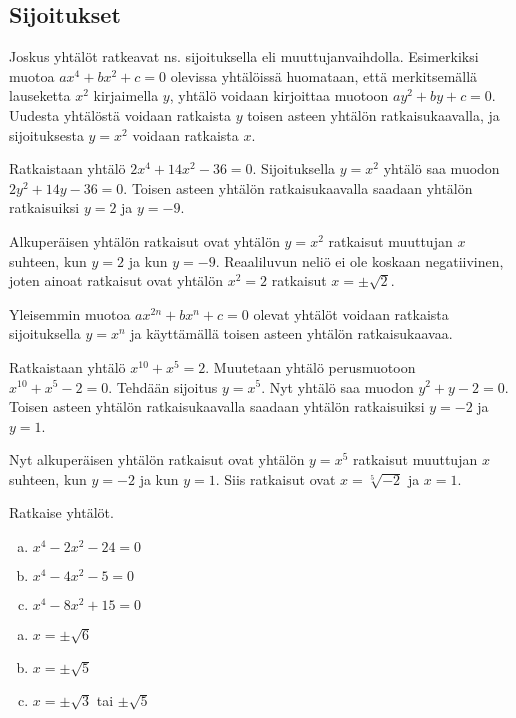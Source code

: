 \subsection*{Sijoitukset}
Joskus yhtälöt ratkeavat ns. sijoituksella eli muuttujanvaihdolla. Esimerkiksi muotoa $ax^4+bx^2+c=0$ olevissa yhtälöissä huomataan, että merkitsemällä
lauseketta $x^2$ kirjaimella $y$, yhtälö voidaan kirjoittaa muotoon $ay^2+by+c=0$. Uudesta yhtälöstä voidaan ratkaista $y$ toisen asteen yhtälön
ratkaisukaavalla, ja sijoituksesta $y = x^2$ voidaan ratkaista $x$.

\begin{esimerkki}
Ratkaistaan yhtälö $2x^4+14x^2-36=0$. Sijoituksella $y = x^2$ yhtälö saa muodon $2y^2+14y-36 = 0$. Toisen asteen yhtälön ratkaisukaavalla saadaan yhtälön ratkaisuiksi $y = 2$ ja $y = -9$.

Alkuperäisen yhtälön ratkaisut ovat yhtälön $y = x^2$ ratkaisut muuttujan $x$ suhteen, kun $y = 2$ ja kun $y = -9$. Reaaliluvun neliö ei ole koskaan
negatiivinen, joten ainoat ratkaisut ovat yhtälön $x^2 = 2$ ratkaisut $x = \pm\sqrt{2}$.
\end{esimerkki}

Yleisemmin muotoa $ax^{2n}+bx^n+c=0$ olevat yhtälöt voidaan ratkaista sijoituksella $y = x^n$ ja käyttämällä toisen asteen yhtälön ratkaisukaavaa.

\begin{esimerkki}
Ratkaistaan yhtälö $x^{10}+x^5=2$. Muutetaan yhtälö perusmuotoon $x^{10}+x^5-2=0$. Tehdään sijoitus $y = x^5$. Nyt yhtälö saa muodon $y^2+y-2 = 0$. Toisen asteen yhtälön ratkaisukaavalla saadaan yhtälön ratkaisuiksi $y = -2$ ja $y = 1$.

Nyt alkuperäisen yhtälön ratkaisut ovat yhtälön $y = x^5$ ratkaisut muuttujan $x$ suhteen, kun $y = -2$ ja kun $y = 1$. Siis ratkaisut ovat $x = \sqrt[5]{-2}$ ja $x = 1$.
\end{esimerkki}

\Harjoitustehtavat

\begin{tehtava}
    Ratkaise yhtälöt.
    \begin{enumerate}[a)]
        \item $x^4 - 2x^2 - 24 = 0$
        \item $x^4 - 4x^2 - 5 = 0$
        \item $x^4 - 8x^2 + 15 = 0$
    \end{enumerate}
    \begin{vastaus}
        \begin{enumerate}[a)]
            \item $x = \pm\sqrt{6}$
            \item $x = \pm\sqrt{5}$
            \item $x = \pm\sqrt{3}$ tai $\pm\sqrt{5}$
        \end{enumerate}
    \end{vastaus}
\end{tehtava}

